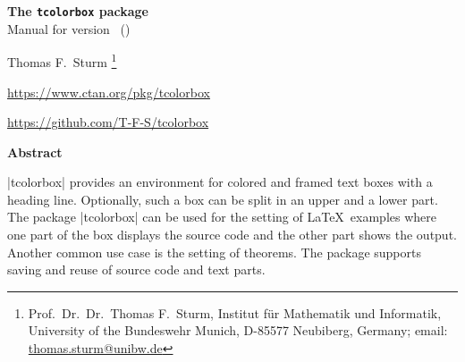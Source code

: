 \tcbuselistingtext
{}


\clearpage
\begin{center}
\begin{tcolorbox}[enhanced,hbox,tikznode,left=8mm,right=8mm,boxrule=0.4pt,
  colback=white,colframe=black!50!yellow,
  drop lifted shadow=black!50!yellow,arc is angular,
  before=\par\vspace*{5mm},after=\par\bigskip]
{\bfseries\LARGE The \texttt{tcolorbox} package}\\[3mm]
{\large Manual for version \version\ (\datum)}
\end{tcolorbox}
{\large Thomas F.~Sturm%
  \footnote{Prof.~Dr.~Dr.~Thomas F.~Sturm, Institut f\"{u}r Mathematik und Informatik,
    University of the Bundeswehr Munich, D-85577 Neubiberg, Germany;
     email: \href{mailto:thomas.sturm@unibw.de}{thomas.sturm@unibw.de}}\par\medskip
\normalsize\url{https://www.ctan.org/pkg/tcolorbox}\par
\url{https://github.com/T-F-S/tcolorbox}}
\end{center}
\bigskip
\begin{absquote}
  \begin{center}\bfseries Abstract\end{center}
  |tcolorbox| provides an environment for colored and framed text boxes with a
  heading line. Optionally, such a box can be split in an upper and a lower
  part. The package |tcolorbox| can be used for the setting of \LaTeX\ examples where
  one part of the box displays the source code and the other part shows the
  output. Another common use case is the setting of theorems. The package supports
  saving and reuse of source code and text parts.
\end{absquote}


